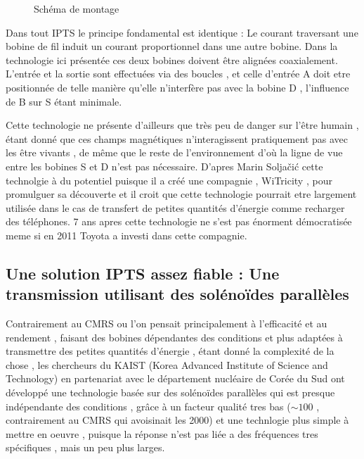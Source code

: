 \documentclass[12pt]{report}
\begin{document}
\begin{figure}
  \begin{center}
    \setlength\fboxsep{0pt}
    \setlength\fboxrule{0.5pt}
  \end{center}
  \caption{Schéma de montage}
\end{figure} Dans tout IPTS le principe fondamental est identique : Le courant traversant une bobine de fil induit un courant proportionnel dans une autre bobine. Dans la technologie ici présentée ces deux bobines doivent être alignées coaxialement. L'entrée et la sortie sont effectuées via des boucles , et celle d'entrée A doit etre positionnée de telle manière qu'elle n'interfère pas avec la bobine D , l'influence de B sur S étant minimale.

  Cette technologie ne présente d'ailleurs que très peu de danger \cite{wiki1} sur l'être humain , étant donné que ces champs magnétiques n'interagissent pratiquement pas avec les être vivants , de même que le reste de l'environnement d'où la ligne de vue entre les bobines S et D n'est pas nécessaire.
 D'apres Marin Soljačić cette technolgie à du potentiel puisque il a créé une compagnie , WiTricity , pour promulguer sa découverte et il croit que cette technologie pourrait etre largement utilisée dans le cas de transfert de petites quantités d'énergie comme recharger des téléphones. 7 ans apres cette technologie ne s'est pas énorment démocratisée meme si en 2011 Toyota a investi dans cette compagnie.
\subsection{Une solution IPTS assez fiable : Une transmission utilisant des solénoïdes parallèles\cite{kaist14}}
Contrairement au CMRS ou l'on pensait principalement à l'efficacité et au rendement , faisant des bobines dépendantes des conditions et plus adaptées à transmettre des petites quantités d'énergie , étant donné la complexité de la chose , les chercheurs du KAIST (Korea Advanced Institute of Science and Technology) en partenariat avec le département nucléaire de Corée du Sud ont développé une technologie basée sur des solénoïdes parallèles qui est presque indépendante des conditions , grâce à un facteur qualité tres bas (\(\sim100\) , contrairement au CMRS qui avoisinait les 2000) et une technlogie plus simple à mettre en oeuvre , puisque la réponse n'est pas liée a des fréquences tres spécifiques , mais un peu plus larges.
  
\end{document}
